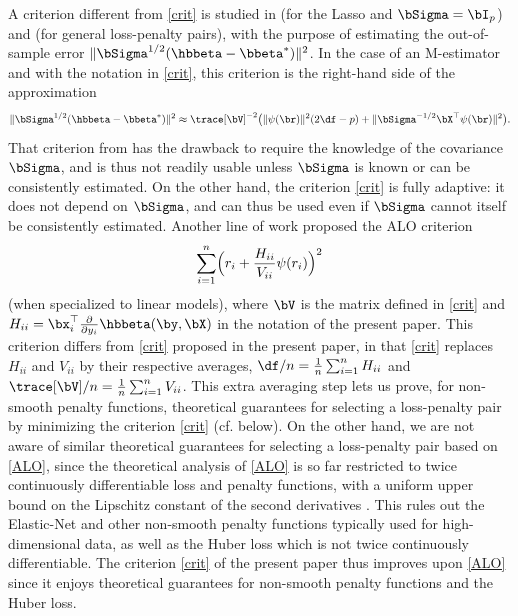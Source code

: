 \documentclass{colt2022} %
\numberwithin{equation}{section}
\begin{document}
A criterion
different from \eqref{crit} is studied
in \cite{bayati2013estimating,miolane2018distribution} (for the Lasso and
$\bSigma=\bI_p$)
and \cite{bellec2020out_of_sample} (for general loss-penalty pairs),
with the purpose of estimating the out-of-sample error
$\|\bSigma^{1/2}(\hbbeta - \bbeta^*)\|^2$. In the case of an M-estimator
and with the notation in \eqref{crit}, this criterion is the right-hand side
of the approximation
$$
\|\bSigma^{1/2}(\hbbeta-\bbeta^*)\|^2
\approx
\trace[\bV]^{-2}\bigl(
\|\psi(\br)\|^2(2\df - p)
+ \|\bSigma^{-1/2}\bX^\top \psi(\br)\|^2
\bigr).
$$
That criterion from 
\cite{bayati2013estimating,miolane2018distribution,bellec2020out_of_sample}
has the drawback to require the knowledge of the covariance $\bSigma$,
and is thus not readily usable unless $\bSigma$ is known or can be consistently estimated. On the other hand, the criterion \eqref{crit} is fully adaptive:
it does not depend on $\bSigma$, and can thus be used even if $\bSigma$ cannot
itself be consistently estimated.
Another line of work \citep{rad2020error,xu2021consistent,rad2020scalable}
proposed the ALO criterion
\begin{equation}
    \sum_{i=1}^n \Bigl(r_i + \frac{H_{ii}}{V_{ii}} \psi(r_i)\Bigr)^2
\label{ALO}
\end{equation}
(when specialized to linear models),
where $\bV$ is the matrix defined in \eqref{crit} and
$H_{ii} = \bx_i^\top \frac{\partial}{\partial y_i} \hbbeta(\by,\bX)$
in the notation of the present paper.
This criterion differs from \eqref{crit} proposed in the present paper,
in that \eqref{crit}
replaces $H_{ii}$ and $V_{ii}$ by their respective averages, $\df/n=\frac1n \sum_{i=1}^n H_{ii}$ and $\trace[\bV]/n = \frac1n\sum_{i=1}^n V_{ii}$.
This extra averaging step lets us prove, for non-smooth penalty functions,
theoretical guarantees for selecting a loss-penalty pair by minimizing
the criterion \eqref{crit} (cf.  below). On the other hand, we are not aware
of similar theoretical guarantees for selecting a loss-penalty pair
based on \eqref{ALO}, since the theoretical analysis of \eqref{ALO}
is so far restricted to twice continuously differentiable loss and penalty
functions, with a uniform upper bound on the Lipschitz constant of the
second derivatives \cite[Assumption 6 required in Theorem 3 and Corollary 1]{rad2020scalable}. This rules
out the Elastic-Net and other non-smooth penalty functions typically used
for high-dimensional data, as well
as the Huber loss which is not twice continuously differentiable.
The criterion \eqref{crit} of the present paper thus improves
upon \eqref{ALO} since it enjoys theoretical guarantees for non-smooth
penalty functions and the Huber loss.
\end{document}
